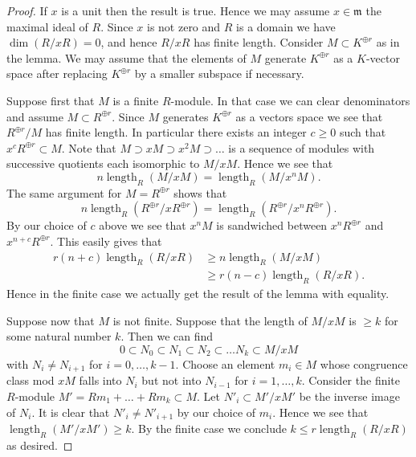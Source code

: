 \documentclass[UTF8,11pt]{ctexart}
\theoremstyle{definition}
\begin{document}
\begin{proof}
If $x$ is a unit then the result is true. Hence we may assume $x\in\mathfrak m$ the maximal ideal of $R$. Since $x$ is not zero and $R$ is a domain we have $\dim(R/xR)=0$, and hence $R/xR$ has finite length. Consider $M\subset K^{\oplus r}$ as in the lemma. We may assume that the elements of $M$ generate $K^{\oplus r}$ as a $K$-vector space after replacing $K^{\oplus r}$ by a smaller subspace if necessary.

Suppose first that $M$ is a finite $R$-module. In that case we can clear denominators and assume $M\subset R^{\oplus r}$. Since $M$ generates $K^{\oplus r}$ as a vectors space we see that $R^{\oplus r}/M$ has finite length. In particular there exists an integer $c\geq0$ such that $x^cR^{\oplus r}\subset M$. Note that $M\supset xM\supset x^2M\supset\ldots$ is a sequence of modules with successive quotients each isomorphic to $M/xM$. Hence we see that
\[n\operatorname{length}_R(M/xM)=\operatorname{length}_R(M/x^nM).\]
The same argument for $M=R^{\oplus r}$ shows that
\[n\operatorname{length}_R(R^{\oplus r}/xR^{\oplus r})=\operatorname{length}_R(R^{\oplus r}/x^nR^{\oplus r}).\]
By our choice of $c$ above we see that $x^nM$ is sandwiched between $x^nR^{\oplus r}$ and $x^{n+c}R^{\oplus r}$. This easily gives that
\[\begin{split}
r(n+c)\operatorname{length}_R(R/xR)&\geq n\operatorname{length}_R(M/xM)\\
&\geq r(n-c)\operatorname{length}_R(R/xR).
\end{split}\]
Hence in the finite case we actually get the result of the lemma with equality.

Suppose now that $M$ is not finite. Suppose that the length of $M/xM$ is $\geq k$ for some natural number $k$. Then we can find
\[0\subset N_0\subset N_1\subset N_2\subset\ldots N_k\subset M/xM\]
with $N_i\ne N_{i+1}$ for $i=0,\ldots,k-1$. Choose an element $m_i\in M$ whose congruence class mod $xM$ falls into $N_i$ but not into $N_{i-1}$ for $i=1,\ldots,k$. Consider the finite $R$-module $M'=Rm_1+\ldots+Rm_k\subset M$. Let $N'_i\subset M'/xM'$ be the inverse image of $N_i$. It is clear that $N'_i\ne N'_{i+1}$ by our choice of $m_i$. Hence we see that $\operatorname{length}_R(M'/xM')\geq k$. By the finite case we conclude $k\leq r\operatorname{length}_R(R/xR)$ as desired.
\end{proof}
\end{document}
